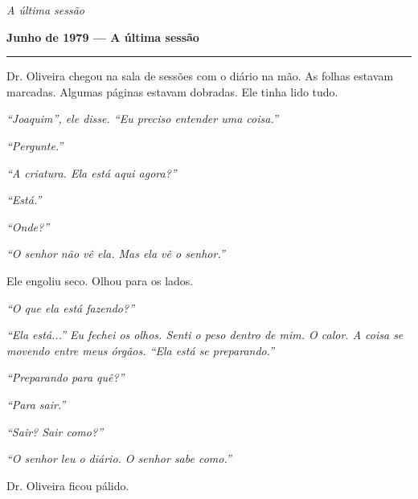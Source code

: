 
\noindent \textit{A última sessão}

\noindent \textbf{Junho de 1979 --- A última sessão}

\vspace{0.5em}\noindent\rule{\textwidth}{0.5pt}\vspace{0.5em}

\noindent Dr. Oliveira chegou na sala de sessões com o diário na mão. As folhas estavam marcadas. Algumas páginas estavam dobradas. Ele tinha lido tudo.

\noindent \textit{\textquotedblleft{}Joaquim\textquotedblright{}\textit{, ele disse. }\textquotedblleft{}Eu preciso entender uma coisa.\textquotedblright{}}

\noindent \textit{\textquotedblleft{}Pergunte.\textquotedblright{}}

\noindent \textit{\textquotedblleft{}A criatura. Ela está aqui agora?\textquotedblright{}}

\noindent \textit{\textquotedblleft{}Está.\textquotedblright{}}

\noindent \textit{\textquotedblleft{}Onde?\textquotedblright{}}

\noindent \textit{\textquotedblleft{}O senhor não vê ela. Mas ela vê o senhor.\textquotedblright{}}

\noindent Ele engoliu seco. Olhou para os lados.

\noindent \textit{\textquotedblleft{}O que ela está fazendo?\textquotedblright{}}

\noindent \textit{\textquotedblleft{}Ela está...\textquotedblright{}\textit{ Eu fechei os olhos. Senti o peso dentro de mim. O calor. A coisa se movendo entre meus órgãos. }\textquotedblleft{}Ela está se preparando.\textquotedblright{}}

\noindent \textit{\textquotedblleft{}Preparando para quê?\textquotedblright{}}

\noindent \textit{\textquotedblleft{}Para sair.\textquotedblright{}}

\noindent \textit{\textquotedblleft{}Sair? Sair como?\textquotedblright{}}

\noindent \textit{\textquotedblleft{}O senhor leu o diário. O senhor sabe como.\textquotedblright{}}

\noindent Dr. Oliveira ficou pálido.

